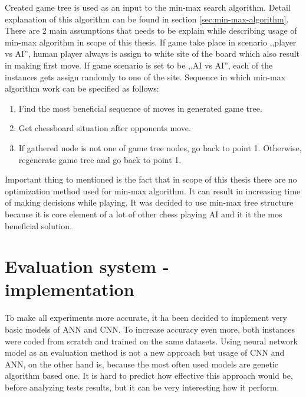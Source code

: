 Created game tree is used as an input to the min-max search algorithm. Detail explanation of this algorithm can be found in section \ref{sec:min-max-algorithm}. There are 2 main assumptions that needs to be explain while describing usage of min-max algorithm in scope of this thesis. If game take place in scenario ,,player vs AI'', human player always is assign to white site of the board which also result in making first move. If game scenario is set to be ,,AI vs AI'', each of the instances gets assign randomly to one of the site. Sequence in which min-max algorithm work can be specified as follows:
\begin{enumerate}
	\item Find the most beneficial sequence of moves in generated game tree.
	\item Get chessboard situation after opponents move.
	\item If gathered node is not one of game tree nodes, go back to point 1. Otherwise, regenerate game tree and go back to point 1.
\end{enumerate}
Important thing to mentioned is the fact that in scope of this thesis there are no optimization method used for min-max algorithm. It can result in increasing time of making decisions while playing. It was decided to use min-max tree structure because it is core element of a lot of other chess playing AI and it it the mos beneficial solution. 

\section{Evaluation system - implementation}\label{sec:evaluation-system-implementation}
To make all experiments more accurate, it ha been decided to implement very basic models of ANN and CNN. To increase accuracy even more, both instances were coded from scratch and trained on the same datasets. Using neural network model as an evaluation method is not a new approach but usage of CNN and ANN, on the other hand is, because the most often used models are genetic algorithm based one. It is hard to predict how effective this approach would be, before analyzing tests results, but it can be very interesting how it perform. 

